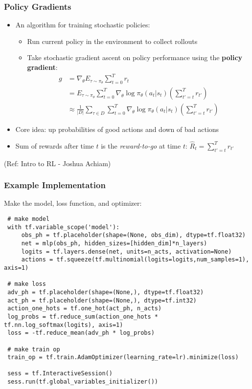 \begin{frame}[fragile]\frametitle{Policy Gradients}

\begin{itemize}
\item An algorithm for training stochastic policies:
\begin{itemize}
\item Run current policy in the environment to collect rollouts
\item Take stochastic gradient ascent on policy performance using the \textbf{policy gradient}:
\begin{align*}
g &= \nabla_{\theta} E_{\tau \sim \pi_{\theta}}{\sum_{t=0}^T r_t} \\
&= E_{\tau \sim \pi_{\theta}}{\sum_{t=0}^T \nabla_{\theta} \log \pi_{\theta}(a_t | s_t) \left(\sum_{t'=t}^T r_{t'}\right)}\\
&\approx \frac{1}{|D|}\sum_{\tau \in D} \sum_{t=0}^T \nabla_{\theta} \log \pi_{\theta}(a_t | s_t) \left(\sum_{t'=t}^T r_{t'}\right)
\end{align*}
\end{itemize}
\item Core idea: up probabilities of good actions and down of bad actions
\item Sum of rewards after time $t$ is the \textit{reward-to-go} at time $t$: $\hat{R}_t = \sum_{t'=t}^T r_{t'}$
\end{itemize}

{\tiny (Ref: Intro to RL - Joshua Achiam)}


\end{frame}

\begin{frame}[fragile]\frametitle{Example Implementation}

Make the model, loss function, and optimizer:
\begin{lstlisting}
 # make model
 with tf.variable_scope('model'):
     obs_ph = tf.placeholder(shape=(None, obs_dim), dtype=tf.float32)
     net = mlp(obs_ph, hidden_sizes=[hidden_dim]*n_layers)
     logits = tf.layers.dense(net, units=n_acts, activation=None)
     actions = tf.squeeze(tf.multinomial(logits=logits,num_samples=1), axis=1)

 # make loss
 adv_ph = tf.placeholder(shape=(None,), dtype=tf.float32)
 act_ph = tf.placeholder(shape=(None,), dtype=tf.int32)
 action_one_hots = tf.one_hot(act_ph, n_acts)
 log_probs = tf.reduce_sum(action_one_hots * tf.nn.log_softmax(logits), axis=1)
 loss = -tf.reduce_mean(adv_ph * log_probs)

 # make train op
 train_op = tf.train.AdamOptimizer(learning_rate=lr).minimize(loss)

 sess = tf.InteractiveSession()
 sess.run(tf.global_variables_initializer())
\end{lstlisting}


\end{frame}

